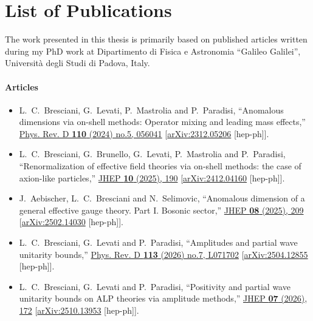 \chapter*{List of Publications}

The work presented in this thesis is primarily based on published articles written during my PhD work at Dipartimento di Fisica e Astronomia ``Galileo Galilei'', Università degli Studi di Padova, Italy.

\subsubsection{Articles}

%
\begin{itemize}[leftmargin=*]
\item[\cite{Bresciani:2023jsu}] L.~C.~Bresciani, G.~Levati, P.~Mastrolia and P.~Paradisi,
``Anomalous dimensions via on-shell methods: Operator mixing and leading mass effects,''
\href{https://doi.org/10.1103/PhysRevD.110.056041}{Phys. Rev. D \textbf{110} (2024) no.5, 056041}
[\href{https://doi.org/10.48550/arXiv.2312.05206}{arXiv:2312.05206} [hep-ph]].

\item[\cite{Bresciani:2024shu}]
L.~C.~Bresciani, G.~Brunello, G.~Levati, P.~Mastrolia and P.~Paradisi,
``Renormalization of effective field theories via on-shell methods: the case of axion-like particles,''
\href{https://doi.org/10.1007/JHEP10(2025)190}{JHEP \textbf{10} (2025), 190}
[\href{https://doi.org/10.48550/arXiv.2412.04160}{arXiv:2412.04160} [hep-ph]].

\item[\cite{Aebischer:2025zxg}]
J.~Aebischer, L.~C.~Bresciani and N.~Selimovic,
``Anomalous dimension of a general effective gauge theory. Part I. Bosonic sector,''
\href{https://doi.org/10.1007/JHEP08(2025)209}{JHEP \textbf{08} (2025), 209}
[\href{https://doi.org/10.48550/arXiv.2502.14030}{arXiv:2502.14030} [hep-ph]].

\item[\cite{Bresciani:2025toe}] 
L.~C.~Bresciani, G.~Levati and P.~Paradisi,
``Amplitudes and partial wave unitarity bounds,''
\href{https://doi.org/10.1103/tp6m-mcyn}{Phys. Rev. D \textbf{113} (2026) no.7, L071702}
[\href{https://doi.org/10.48550/arXiv.2504.12855}{arXiv:2504.12855} [hep-ph]].

\item[\cite{Bresciani:2025ojh}]
L.~C.~Bresciani, G.~Levati and P.~Paradisi,
``Positivity and partial wave unitarity bounds on ALP theories via amplitude methods,''
\href{https://doi.org/10.1007/JHEP07(2026)172}{JHEP \textbf{07} (2026), 172}
[\href{https://doi.org/10.48550/arXiv.2510.13953}{arXiv:2510.13953} [hep-ph]].


\end{itemize}
